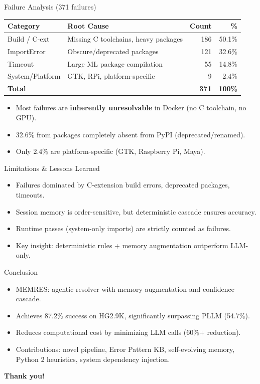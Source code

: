 \documentclass{beamer}
\begin{document}
\begin{frame}{Failure Analysis (371 failures)}
  \begin{center}
  \begin{tabular}{llrr}
    \toprule
    \textbf{Category} & \textbf{Root Cause} & \textbf{Count} & \textbf{\%} \\
    \midrule
    Build / C-ext & Missing C toolchains, heavy packages & 186 & 50.1\% \\
    ImportError & Obscure/deprecated packages & 121 & 32.6\% \\
    Timeout & Large ML package compilation & 55 & 14.8\% \\
    System/Platform & GTK, RPi, platform-specific & 9 & 2.4\% \\
    \midrule
    \textbf{Total} & & \textbf{371} & \textbf{100\%} \\
    \bottomrule
  \end{tabular}
  \end{center}
  \vspace{0.5em}
  \begin{itemize}\small
    \item Most failures are \textbf{inherently unresolvable} in Docker (no C toolchain, no GPU).
    \item 32.6\% from packages completely absent from PyPI (deprecated/renamed).
    \item Only 2.4\% are platform-specific (GTK, Raspberry Pi, Maya).
  \end{itemize}
\end{frame}

\begin{frame}{Limitations \& Lessons Learned}
  \begin{itemize}
    \item Failures dominated by C-extension build errors, deprecated packages, timeouts.
    \item Session memory is order-sensitive, but deterministic cascade ensures accuracy.
    \item Runtime passes (system-only imports) are strictly counted as failures.
    \item Key insight: deterministic rules + memory augmentation outperform LLM-only.
  \end{itemize}
\end{frame}

\begin{frame}{Conclusion}
  \begin{itemize}
    \item MEMRES: agentic resolver with memory augmentation and confidence cascade.
    \item Achieves 87.2\% success on HG2.9K, significantly surpassing PLLM (54.7\%).
    \item Reduces computational cost by minimizing LLM calls (60\%+ reduction).
    \item Contributions: novel pipeline, Error Pattern KB, self-evolving memory, Python 2 heuristics, system dependency injection.
  \end{itemize}
  \vspace{1em}
  \centering\textbf{Thank you!}
\end{frame}
\end{document}
